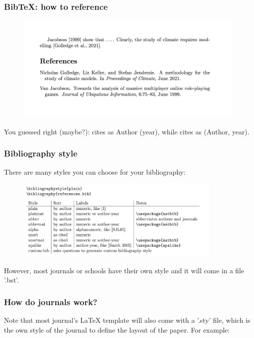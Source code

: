\begin{frame}[fragile]
\frametitle{BibTeX: how to reference}
\begin{figure}
\includegraphics[width=120mm]{figures/Citing.png}
\end{figure}
You guessed right (maybe?): \color{blue}{\verb|\citet|} \color{black}{} cites as Author (year), while \color{blue}{\verb|\citep|} \color{black}{} cites as (Author, year).
\end{frame}



\begin{frame}[fragile]
\frametitle{Bibliography style}
There are many styles you can choose for your bibliography:
\begin{figure}
\includegraphics[width=100mm]{figures/bibliostyle.png}
\end{figure}
However, most journals or schools have their own style and it will come in a file '.bst'. 
\end{frame}

\begin{frame}[fragile]
\frametitle{How do journals work?}
Note that most journal's \LaTeX{} template will also come with a '.sty' file, which is the own style of the journal to define the layout of the paper. For example:
\end{frame}


